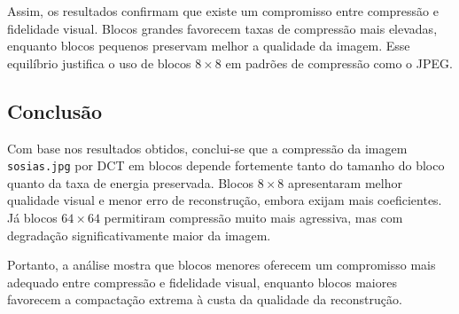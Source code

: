 \documentclass[12pt,a4paper]{article}
\begin{document}
Assim, os resultados confirmam que existe um compromisso entre compressão e fidelidade visual. Blocos grandes favorecem taxas de compressão mais elevadas, enquanto blocos pequenos preservam melhor a qualidade da imagem. Esse equilíbrio justifica o uso de blocos \(8 \times 8\) em padrões de compressão como o JPEG.

\subsection{Conclusão}

Com base nos resultados obtidos, conclui-se que a compressão da imagem \texttt{sosias.jpg} por DCT em blocos depende fortemente tanto do tamanho do bloco quanto da taxa de energia preservada. Blocos \(8 \times 8\) apresentaram melhor qualidade visual e menor erro de reconstrução, embora exijam mais coeficientes. Já blocos \(64 \times 64\) permitiram compressão muito mais agressiva, mas com degradação significativamente maior da imagem.

Portanto, a análise mostra que blocos menores oferecem um compromisso mais adequado entre compressão e fidelidade visual, enquanto blocos maiores favorecem a compactação extrema à custa da qualidade da reconstrução.
\end{document}
